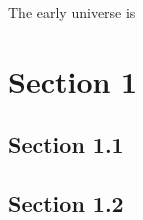 \documentclass[a4paper]{article}
\begin{document}
 

\maketitle

{\small     
\setlength{\parindent}{0em}
\setlength{\parskip}{1em}
    The early universe is 
}

\tableofcontents
\newpage

\section{Section 1}
\lipsum
\subsection{Section 1.1}
\lipsum 
\lipsum
\subsection{Section 1.2}
\lipsum 
\lipsum

\nocite{taplecture} 
\printbibliography

\immediate{}
\end{document}
